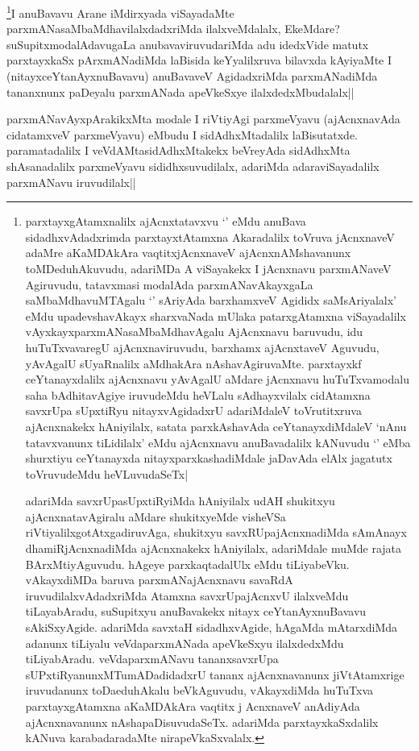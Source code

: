 \begin{artha}
\footnote{parxtayxgAtamxnalilx ajAcnxtatavxvu `\stext' eMdu anuBava sidadhxvAdadxrimda parxtayxtAtamxna Akaradalilx toVruva jAcnxnaveV adaMre aKaMDAkAra vaqtitxjAcnxnaveV ajAcnxnAMshavanunx toMDeduhAkuvudu, adariMDa A viSayakekx I jAcnxnavu parxmANaveV Agiruvudu, tatavxmasi modalAda parxmANavAkayxgaLa saMbaMdhavuMTAgalu `\stext' sAriyAda barxhamxveV Agididx saMsAriyalalx' eMdu upadevshavAkayx sharxvaNada mUlaka patarxgAtamxna viSayadalilx vAyxkayxparxmANasaMbaMdhavAgalu AjAcnxnavu baruvudu, idu huTuTxvavaregU ajAcnxnaviruvudu, barxhamx ajAcnxtaveV Aguvudu, yAvAgalU sUyaRnalilx aMdhakAra nAshavAgiruvaMte. parxtayxkf ceYtanayxdalilx ajAcnxnavu yAvAgalU aMdare jAcnxnavu huTuTxvamodalu saha bAdhitavAgiye iruvudeMdu heVLalu sAdhayxvilalx cidAtamxna savxrUpa sUpxtiRyu nitayxvAgidadxrU adariMdaleV toVrutitxruva ajAcnxnakekx hAniyilalx, satata parxkAshavAda ceYtanayxdiMdaleV `nAnu tatavxvanunx tiLidilalx' eMdu ajAcnxnavu anuBavadalilx kANuvudu `\stext' eMba shurxtiyu ceYtanayxda nitayxparxkashadiMdale jaDavAda elAlx jagatutx toVruvudeMdu heVLuvudaSeTx|

adariMda savxrUpasUpxtiRyiMda hAniyilalx udAH shukitxyu ajAcnxnatavAgiralu aMdare shukitxyeMde visheVSa riVtiyalilxgotAtxgadiruvAga, shukitxyu savxRUpajAcnxnadiMda sAmAnayx dhamiRjAcnxnadiMda ajAcnxnakekx hAniyilalx, adariMdale muMde rajata BArxMtiyAguvudu. hAgeye parxkaqtadalUlx eMdu tiLiyabeVku. vAkayxdiMDa baruva parxmANajAcnxnavu savaRdA iruvudilalxvAdadxriMda Atamxna savxrUpajAcnxvU ilalxveMdu tiLayabAradu, suSupitxyu anuBavakekx nitayx ceYtanAyxnuBavavu sAkiSxyAgide. adariMda savxtaH sidadhxvAgide, hAgaMda mAtarxdiMda adanunx tiLiyalu veVdaparxmANada apeVkeSxyu ilalxdedxMdu tiLiyabAradu. veVdaparxmANavu tananxsavxrUpa sUPxtiRyanunxMTumADadidadxrU tananx ajAcnxnavanunx jiVtAtamxrige iruvudanunx toDaeduhAkalu beVkAguvudu, vAkayxdiMda huTuTxva parxtayxgAtamxna aKaMDAkAra vaqtitx j AcnxnaveV anAdiyAda ajAcnxnavanunx nAshapaDisuvudaSeTx. adariMda parxtayxkaSxdalilx kANuva karabadaradaMte nirapeVkaSxvalalx.}I anuBavavu Arane iMdirxyada viSayadaMte parxmANasaMbaMdhavilalxdadxriMda ilalxveMdalalx, EkeMdare? suSupitxmodalAdavugaLa anubavaviruvudariMda adu idedxVide matutx parxtayxkaSx pArxmANadiMda laBisida keYyalilxruva bilavxda kAyiyaMte I (nitayxceYtanAyxnuBavavu) anuBavaveV AgidadxriMda parxmANadiMda tananxnunx paDeyalu parxmANada apeVkeSxye ilalxdedxMbudalalx||
\end{artha}

\begin{artha}
parxmANavAyxpArakikxMta modale I riVtiyAgi parxmeVyavu (ajAcnxnavAda cidatamxveV parxmeVyavu) eMbudu I sidAdhxMtadalilx laBisutatxde. paramatadalilx I veVdAMtasidAdhxMtakekx beVreyAda sidAdhxMta shAsanadalilx parxmeVyavu sididhxsuvudilalx, adariMda adaraviSayadalilx parxmANavu iruvudilalx||
\end{artha}


